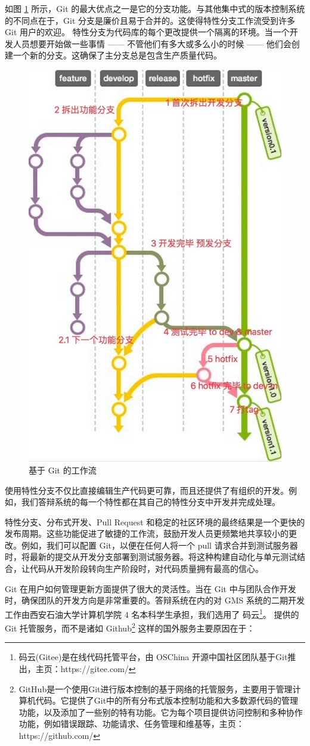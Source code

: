 如图 \ref{git-flow} 所示，Git 的最大优点之一是它的分支功能。与其他集中式的版本控制系统的不同点在于，Git 分支是廉价且易于合并的。这使得特性分支工作流受到许多 Git 用户的欢迎。
特性分支为代码库的每个更改提供一个隔离的环境。当一个开发人员想要开始做一些事情 —— 不管他们有多大或多么小的时候 —— 他们会创建一个新的分支。这确保了主分支总是包含生产质量代码。

\begin{figure}
	\centering
	\includegraphics[width=0.6\linewidth]{figure/git-flow}
	\caption{基于 Git 的工作流}
	\label{git-flow}
\end{figure}

使用特性分支不仅比直接编辑生产代码更可靠，而且还提供了有组织的开发。例如，我们答辩系统的每一个特性都在其自己的特性分支中开发并完成处理。

特性分支、分布式开发、Pull Request 和稳定的社区环境的最终结果是一个更快的发布周期。这些功能促进了敏捷的工作流，鼓励开发人员更频繁地共享较小的更改。例如，我们可以配置 Git，以便在任何人将一个 pull 请求合并到测试服务器时，将最新的提交从开发分支部署到测试服务器。将这种构建自动化与单元测试结合，让代码从开发阶段转向生产阶段时，对代码质量拥有最高的信心。

Git 在用户如何管理更新方面提供了很大的灵活性。当在 Git 中与团队合作开发时，确保团队的开发方向是非常重要的。答辩系统在内的对 GMS 系统的二期开发工作由西安石油大学计算机学院 4 名本科学生承担，我们选用了
码云\footnote{码云(Gitee)是在线代码托管平台，由 OSChina 开源中国社区团队基于Git推出，主页：https://gitee.com/}。
提供的 Git 托管服务，而不是诸如 
Github\footnote{GitHub是一个使用Git进行版本控制的基于网络的托管服务，主要用于管理计算机代码。它提供了Git中的所有分布式版本控制功能和大多数源代码的管理功能，以及添加了一些别的特有功能。它为每个项目提供访问控制和多种协作功能，例如错误跟踪、功能请求、任务管理和维基等，主页：https://github.com/} 
这样的国外服务主要原因在于：

